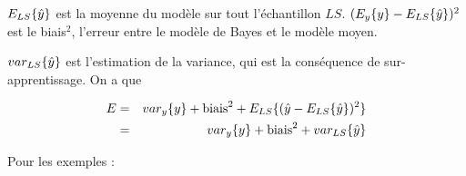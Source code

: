 		
	$E_{LS}\{\hat{y}\}$ est la moyenne du modèle sur tout l'échantillon $LS$. $(E_y\{y\} - E_{LS}\{\hat{y}\})^2$ est le biais$^2$, l'erreur entre le modèle de Bayes et le modèle moyen.
		
	
	$var_{LS}\{\hat{y}\}$ est l'estimation de la variance, qui est la conséquence de sur-apprentissage. On a que
	
	\begin{eqnarray*}
	E & = & var_y\{y\} + \text{biais}^2 + E_{LS}\{(\hat{y} - E_{LS}\{\hat{y}\})^2\} \\
     & = & var_y\{y\} + \text{biais}^2 + var_{LS}\{\hat{y}\}
	\end{eqnarray*}
	
	
	
	Pour les exemples :
	
